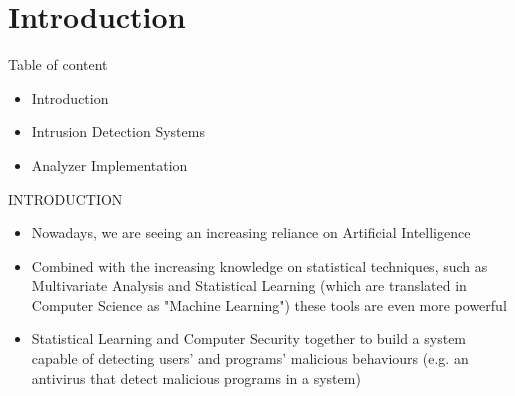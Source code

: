 \footnotesize

\section{Introduction}

	\begin{frame}{Table of content}
	
	\begin{itemize}
		\item Introduction
		\vspace{0.3cm}
		\item Intrusion Detection Systems
		\vspace{0.3cm}
		\item Analyzer Implementation
		\begin{itemize}
		\end{itemize}
	\end{itemize}
	
	\end{frame}

	\begin{frame}
		\begin{center}
			\begin{Huge}
				INTRODUCTION
			\end{Huge}
		\end{center}
	\end{frame}
	
	\begin{frame}
		\begin{itemize}
			\item Nowadays, we are seeing an increasing reliance on Artificial Intelligence
			\vspace{0.3cm}
			\item Combined with the increasing knowledge on statistical techniques, such as Multivariate Analysis and Statistical Learning (which are translated in Computer Science as "Machine Learning") these tools are even more powerful
			\vspace{0.3cm}
			\item Statistical Learning and Computer Security together to build a system capable of detecting users' and programs' malicious behaviours (e.g. an antivirus that detect malicious programs in a system)
		\end{itemize}
	\end{frame}
	
